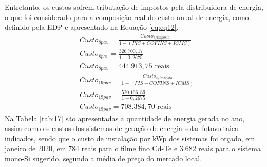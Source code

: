 \noindent Entretanto, os custos sofrem tributação de impostos pela distribuidora de energia, o que foi considerado para a composição real do custo anual de energia, como definido pela EDP e apresentado na Equação \ref{eq:eq12}.
\begin{align}\label{eq:eq12}
    &Custo_{8pav}=\frac{Custo_{s/imposto}}{1-(PIS+COFINS+ICMS)} \nonumber \\
    &Custo_{8pav}=\frac{326.700,17}{1-0,2675}\nonumber \\
    &Custo_{8pav}=444.913,75 \text{ reais}\nonumber \\
    &Custo_{19pav}=\frac{Custo_{s/imposto}}{1-(PIS+COFINS+ICMS)} \nonumber \\
    &Custo_{19pav}=\frac{520.166,89}{1-0,2675}\nonumber \\ 
    &Custo_{19pav}=708.384,70 \text{ reais}
\end{align}
\noindent Na Tabela \ref{tab:17} são apresentadas a quantidade de energia gerada no ano, assim como os custos dos sistemas de geração de energia solar fotovoltaica indicados, sendo que o custo de instalação por kWp dos sistemas foi orçado, em janeiro de 2020, em 784 reais para o filme fino Cd-Te \cite{Sorgato2018} e 3.682 reais para o sistema mono-Si sugerido, segundo a média de preço do mercado local.\newline
